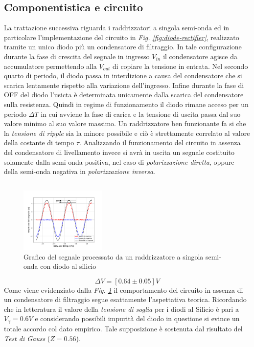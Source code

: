 \documentclass[journal]{IEEEtran}
\begin{document}
\subsection{\textbf{Componentistica e circuito}}
La trattazione successiva riguarda i raddrizzatori a singola semi-onda ed in particolare l'implementazione del circuito in \textit{Fig. \ref{fig:diode-rectifier}}, realizzato tramite un unico diodo più un condensatore di filtraggio. In tale configurazione durante la fase di crescita del segnale in ingresso $V_{in}$ il condensatore agisce da accumulatore permettendo alla $V_{out}$ di copiare la tensione in entrata. Nel secondo quarto di periodo, il diodo passa in interdizione a causa del condensatore che si scarica lentamente rispetto alla variazione dell'ingresso. Infine durante la fase di OFF del diodo l'usicta è determinata unicamente dalla scarica del condensatore sulla resistenza.
Quindi in regime di funzionamento il diodo rimane acceso per un periodo $\Delta T$ in cui avviene la fase di carica e la tensione di uscita passa dal suo valore minimo al suo valore massimo. Un raddrizzatore ben funzionante fa si che la \textit{tensione di ripple} sia la minore possibile e ciò è strettamente correlato al valore della costante di tempo $\tau$.
Analizzando il funzionamento del circuito in assenza del condensatore di livellamento invece si avrà in uscita un segnale costituito solamente dalla semi-onda positiva, nel caso di \textit{polarizzazione diretta}, oppure della semi-onda negativa in \textit{polarizzazione inversa}.

\subsection{}
\begin{figure}[H]%
\begin {center}
\includegraphics[width=0.38\textwidth]{analysis/output/half-wave-rectifier.pdf}
\caption{Grafico del segnale processato da un raddrizzatore a singola semi-onda con diodo al silicio}
\label{fig:half-wave}
\end {center}
\end{figure}
\[\Delta V = [0.64 \pm 0.05] V\] 
Come viene evidenziato dalla \textit{Fig. \ref{fig:half-wave}} il comportamento del circuito in assenza di un condensatore di filtraggio segue esattamente l'aspettativa teorica. Ricordando che in letteratura il valore della \textit{tensione di soglia} per i diodi al Silicio è pari a $V_{\gamma}=0.6V$ e considerando possibili impurità del diodo in questione si evince un totale accordo col dato empirico. Tale supposizione è sostenuta dal risultato del \textit{Test di Gauss} ($Z = 0.56$).
\end{document}
